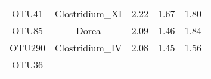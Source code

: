 \documentclass[12pt,]{article}
\begin{document}
\begin{longtable}[]{@{}ccccc@{}}
\begin{minipage}[t]{0.07\columnwidth}
OTU41\strut
\end{minipage} & \begin{minipage}[t]{0.18\columnwidth}\centering\strut
Clostridium\_XI\strut
\end{minipage} & \begin{minipage}[t]{0.17\columnwidth}\centering\strut
2.22\strut
\end{minipage} & \begin{minipage}[t]{0.25\columnwidth}\centering\strut
1.67\strut
\end{minipage} & \begin{minipage}[t]{0.19\columnwidth}\centering\strut
1.80\strut
\end{minipage}\tabularnewline
\begin{minipage}[t]{0.07\columnwidth}\centering\strut
OTU85\strut
\end{minipage} & \begin{minipage}[t]{0.18\columnwidth}\centering\strut
Dorea\strut
\end{minipage} & \begin{minipage}[t]{0.17\columnwidth}\centering\strut
2.09\strut
\end{minipage} & \begin{minipage}[t]{0.25\columnwidth}\centering\strut
1.46\strut
\end{minipage} & \begin{minipage}[t]{0.19\columnwidth}\centering\strut
1.84\strut
\end{minipage}\tabularnewline
\begin{minipage}[t]{0.07\columnwidth}\centering\strut
OTU290\strut
\end{minipage} & \begin{minipage}[t]{0.18\columnwidth}\centering\strut
Clostridium\_IV\strut
\end{minipage} & \begin{minipage}[t]{0.17\columnwidth}\centering\strut
2.08\strut
\end{minipage} & \begin{minipage}[t]{0.25\columnwidth}\centering\strut
1.45\strut
\end{minipage} & \begin{minipage}[t]{0.19\columnwidth}\centering\strut
1.56\strut
\end{minipage}\tabularnewline
\begin{minipage}[t]{0.07\columnwidth}\centering\strut
OTU36\strut
\end{minipage} & \begin{minipage}[t]{0.18\columnwidth}\centering\strut

\end{minipage}
\end{longtable}
\end{document}
